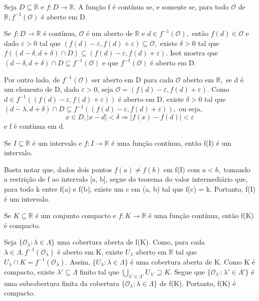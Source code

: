 \documentclass[analysis_notes.tex]{subfiles}
\begin{document}
\begin{theorem*}
	Seja $D\subseteq{\mathbb{R}}$ e $f:D\rightarrow \mathbb{R}.$ A função f é contínua se, e somente se, para todo
	$\mathcal{O}$ de $\mathbb{R}, f^{-1}(\mathcal{O})$ é aberto em D.
\end{theorem*}
\begin{proof*}
	Se $f:D\rightarrow \mathbb{R}$ é contínua, $\mathcal{O}$ é um aberto de $\mathbb{R}$ e $d\in f^{-1}(\mathcal{O}),$
	então $f(d)\in \mathcal{O}$ e dado $\varepsilon  > 0$ tal que $(f(d)-\varepsilon , f(d)+\varepsilon )\subseteq{\mathcal{O}},$
	existe $\delta >0$ tal que $f((d-\delta , d+\delta )\cap D)\subseteq{(f(d)-\varepsilon , f(d)+\varepsilon ).}$ Isot mostra que
	$(d-\delta , d+\delta )\cap D\subseteq{f^{-1}(\mathcal{O})}$ e que $f^{-1}(\mathcal{O})$ é aberto em D.

	Por outro lado, de $f^{-1}(\mathcal{O})$ ser aberto em D para cada $\mathcal{O}$ aberto em $\mathbb{R},$ se d é um elemento
	de D, dado $\varepsilon  > 0$, seja $\mathcal{O} = (f(d)-\varepsilon , f(d)+\varepsilon ).$ Como $d\in f^{-1}((f(d)-\varepsilon , f(d)+\varepsilon ))$
	é aberto em D, existe $\delta >0$ tal que $(d-\lambda , d+\delta )\cap D\subseteq{f^{-1}((f(d)-\varepsilon , f(d)+\varepsilon ))},$
	ou seja,
	$$
		x\in D, |x-d| < \delta \Rightarrow |f(x)-f(d)| < \varepsilon
	$$
	e f é contínua em d. \qedsymbol
\end{proof*}
\begin{theorem*}
	Se $I\subseteq{\mathbb{R}}$ é um intervalo e $f:I\rightarrow \mathbb{R}$ é uma função contínua, então f(I) é um intervalo.
\end{theorem*}
\begin{proof*}
	Basta notar que, dados dois pontos $f(a)\neq f(b)$ em f(I) com $a < b,$ tomando a restrição de f ao intervalo [a, b],
	segue do teorema do valor intermediário que, para todo k entre f(a) e f(b), existe um c em (a, b) tal que f(c) = k. Portanto,
	f(I) é um intervalo. \qedsymbol
\end{proof*}
\begin{theorem*}
	Se $K\subseteq{\mathbb{R}}$ é um conjunto compacto e $f:K\rightarrow \mathbb{R}$ é uma função contínua, então f(K) é compacto.
\end{theorem*}
\begin{proof*}
	Seja $\{\mathcal{O}_{\lambda }:\lambda \in\Lambda \}$ uma cobertura aberta de f(K). Como, para cada $\lambda \in \Lambda, f^{-1}(\mathcal{O}_{\lambda })$
	é aberto em K, existe $U_{\lambda }$ aberto em $\mathbb{R}$ tal que $U_{\lambda }\cap K = f^{-1}(\mathcal{O}_{\lambda }).$
	Assim, $\{U_{\lambda }:\lambda \in\Lambda \}$ é uma cobertura aberta de K. Como K é compacto, existe $\lambda '\subseteq{\Lambda }$
	finito tal que $\bigcup_{\lambda '\in\Lambda '}^{}{U_{\lambda '}}\supseteq{K}.$ Segue que $\{\mathcal{O}_{\lambda '}: \lambda '\in\Lambda '\}$
	é uma subcobertura finita da cobertura $\{\mathcal{O}_{\lambda }:\lambda \in \Lambda \}$ de f(K). Portanto, f(K) é compacto. \qedsymbol
\end{proof*}
\end{document}
